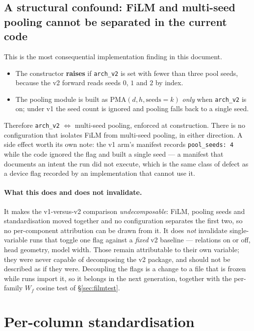 \documentclass[11pt,a4paper]{article}
\begin{document}
\subsection{A structural confound: FiLM and multi-seed pooling cannot be
separated in the current code}
\label{sec:confound}

This is the most consequential implementation finding in this document.

\begin{itemize}\itemsep2pt
\item The constructor \textbf{raises} if \texttt{arch\_v2} is set with fewer than
three pool seeds, because the v2 forward reads seeds $0$, $1$ and $2$ by index.
\item The pooling module is built as $\mathrm{PMA}(d,h,\text{seeds}=k)$ \emph{only}
when \texttt{arch\_v2} is on; under v1 the seed count is ignored and pooling
falls back to a single seed.
\end{itemize}

\noindent
Therefore \texttt{arch\_v2} $\Leftrightarrow$ multi-seed pooling, enforced at
construction. There is no configuration that isolates FiLM from multi-seed
pooling, in either direction. A side effect worth its own note: the v1 arm's
manifest records \texttt{pool\_seeds: 4} while the code ignored the flag and
built a single seed --- a manifest that documents an intent the run did not
execute, which is the same class of defect as a device flag recorded by an
implementation that cannot use it.

\paragraph{What this does and does not invalidate.} It makes the v1-versus-v2
comparison \emph{undecomposable}: FiLM, pooling seeds and standardisation moved
together and no configuration separates the first two, so no per-component
attribution can be drawn from it. It does \emph{not} invalidate single-variable
runs that toggle one flag against a \emph{fixed} v2 baseline --- relations on or
off, head geometry, model width. Those remain attributable to their own
variable; they were never capable of decomposing the v2 package, and should not
be described as if they were. Decoupling the flags is a change to a file that is
frozen while runs import it, so it belongs in the next generation, together with
the per-family $W_f$ cosine test of \S\ref{sec:filmtest}.

\section{Per-column standardisation}
\end{document}

